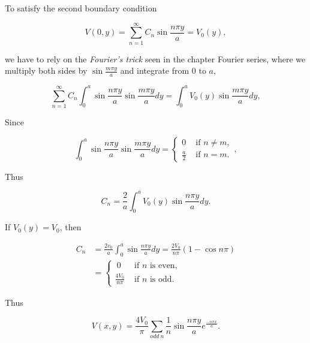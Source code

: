\documentclass[a4paper,12pt]{report}
\begin{document}
\begin{example_template}
		To satisfy the second boundary condition
		
		\begin{equation}
			V(0,y) = \sum_{n=1}^{\infty} C_{n} \sin \frac{n\pi y}{a} = V_0(y) ,
		\end{equation}
		
		we have to rely on the \emph{Fourier's trick} seen in the chapter Fourier series, where we multiply both sides by \(\sin \frac{m\pi y}{a} \) and integrate from \(0 \text { to } a\),
		
		\begin{equation}
			\sum_{n=1}^{\infty} C_{n} \int_{0}^{a} \sin \frac{n\pi y}{a} \sin \frac{m\pi y}{a} dy = \int_{0}^{a} V_0(y) \sin \frac{m\pi y}{a} dy,				 
		\end{equation}
		
		Since 
		
		\begin{equation}
			\int_{0}^{a} \sin \frac{n\pi y}{a} \sin \frac{m\pi y}{a} dy = \begin{cases}
				0 &\text { if } n \neq m, \\ \frac{a}{2} &\text { if } n = m.
			\end{cases},
		\end{equation}
		
		Thus 
		
		\begin{equation}
			C_{n}  = \frac{2}{a} \int_{0}^{a} V_0(y) \sin \frac{n\pi y}{a} dy.  
		\end{equation}
		
		If \(V_0(y) = V_0\), then 
		
		\begin{equation}
			\begin{aligned}
				C_{n} &= \frac{2v_0}{a} \int_{0}^{a} \sin \frac{n\pi y}{a} dy = \frac{2V_0}{n\pi } (1 - \cos n\pi )  \\ 
				&= \begin{cases}
					~ 0 &\text { if } n  \text{ is even}, \\
					\frac{4V_0}{n\pi } &\text { if } n \text{ is odd} .
				\end{cases} 
			\end{aligned}
		\end{equation}
		
		Thus
		
		\begin{equation}
			V(x,y) = \frac{4V_0}{\pi } \sum_{odd~n}^{} \frac{1}{n} \sin \frac{n\pi y}{a}  e^{\frac{-n\pi x}{a}}. 
		\end{equation}
		

\end{example_template}
\end{document}
